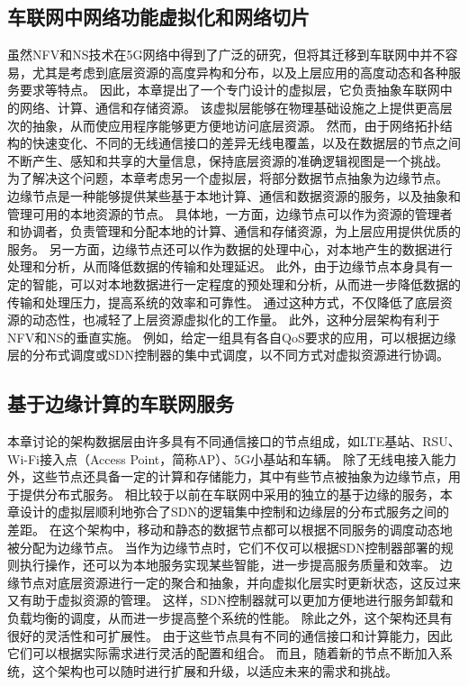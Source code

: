 \subsection{车联网中网络功能虚拟化和网络切片}
虽然NFV和NS技术在5G网络中得到了广泛的研究，但将其迁移到车联网中并不容易，尤其是考虑到底层资源的高度异构和分布，以及上层应用的高度动态和各种服务要求等特点。
因此，本章提出了一个专门设计的虚拟层，它负责抽象车联网中的网络、计算、通信和存储资源。
该虚拟层能够在物理基础设施之上提供更高层次的抽象，从而使应用程序能够更方便地访问底层资源。
然而，由于网络拓扑结构的快速变化、不同的无线通信接口的差异无线电覆盖，以及在数据层的节点之间不断产生、感知和共享的大量信息，保持底层资源的准确逻辑视图是一个挑战。
为了解决这个问题，本章考虑另一个虚拟层，将部分数据节点抽象为边缘节点。
边缘节点是一种能够提供某些基于本地计算、通信和数据资源的服务，以及抽象和管理可用的本地资源的节点。
具体地，一方面，边缘节点可以作为资源的管理者和协调者，负责管理和分配本地的计算、通信和存储资源，为上层应用提供优质的服务。
另一方面，边缘节点还可以作为数据的处理中心，对本地产生的数据进行处理和分析，从而降低数据的传输和处理延迟。
此外，由于边缘节点本身具有一定的智能，可以对本地数据进行一定程度的预处理和分析，从而进一步降低数据的传输和处理压力，提高系统的效率和可靠性。
通过这种方式，不仅降低了底层资源的动态性，也减轻了上层资源虚拟化的工作量。
此外，这种分层架构有利于NFV和NS的垂直实施。
例如，给定一组具有各自QoS要求的应用，可以根据边缘层的分布式调度或SDN控制器的集中式调度，以不同方式对虚拟资源进行协调。

\subsection{基于边缘计算的车联网服务}

本章讨论的架构数据层由许多具有不同通信接口的节点组成，如LTE基站、RSU、Wi-Fi接入点（Access Point，简称AP）、5G小基站和车辆。
除了无线电接入能力外，这些节点还具备一定的计算和存储能力，其中有些节点被抽象为边缘节点，用于提供分布式服务。
相比较于以前在车联网中采用的独立的基于边缘的服务，本章设计的虚拟层顺利地弥合了SDN的逻辑集中控制和边缘层的分布式服务之间的差距。
在这个架构中，移动和静态的数据节点都可以根据不同服务的调度动态地被分配为边缘节点。
当作为边缘节点时，它们不仅可以根据SDN控制器部署的规则执行操作，还可以为本地服务实现某些智能，进一步提高服务质量和效率。
边缘节点对底层资源进行一定的聚合和抽象，并向虚拟化层实时更新状态，这反过来又有助于虚拟资源的管理。
这样，SDN控制器就可以更加方便地进行服务卸载和负载均衡的调度，从而进一步提高整个系统的性能。
除此之外，这个架构还具有很好的灵活性和可扩展性。
由于这些节点具有不同的通信接口和计算能力，因此它们可以根据实际需求进行灵活的配置和组合。
而且，随着新的节点不断加入系统，这个架构也可以随时进行扩展和升级，以适应未来的需求和挑战。

